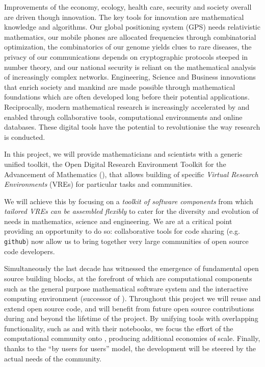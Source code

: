 Improvements of the economy, ecology, health care, security and
society overall are driven though innovation. The key tools
for innovation are mathematical knowledge and
algorithms. Our global positioning system (GPS)
needs relativistic mathematics, our mobile phones are allocated frequencies through
combinatorial optimization, the combinatorics of our genome yields clues to rare diseases, 
the privacy of our communications depends on cryptographic protocols steeped in number theory,  
and our national security is reliant on the mathematical analysis of increasingly complex networks. Engineering, Science and Business
innovations that enrich society and mankind are made possible through
mathematical foundations which are often developed long before their potential
applications.
%
Reciprocally, modern mathematical research is increasingly accelerated by and
enabled through collaborative tools, computational environments and
online databases. These digital tools have the potential to
revolutionise the way research is conducted.

In this project, we will provide mathematicians and scientists with a
generic unified toolkit, the Open Digital Research Environment Toolkit
for the Advancement of Mathematics (\TheProject), that allows
building of specific \emph{Virtual Research Environments} (VREs) for
particular tasks and communities.


We will achieve this by focusing on a \emph{toolkit of software
  components} from which \emph{tailored VREs can be assembled
  flexibly} to cater for the diversity and evolution of needs in
mathematics, science and engineering.  We are at a critical point providing
an opportunity to do so: collaborative tools for code sharing (e.g.
\texttt{github}) now allow us to bring together very large communities
of open source code developers. %

Simultaneously the last decade has witnessed the emergence of fundamental
open source building blocks, at the forefront of which are computational
components such as the general purpose mathematical software system \Sage
and the interactive computing environment \Jupyter (successor of \IPython).
Throughout this project we will reuse and extend open source code, and
\TheProject will benefit from future open source contributions during
and beyond the lifetime of the project. By unifying tools with
overlapping functionality, such as \Jupyter and \Sage with their notebooks, we focus the
effort of the computational community onto \TheProject, producing
additional economies of scale.
Finally, thanks to the ``by users for
users'' model, the development will be steered by the actual needs of
the community.

